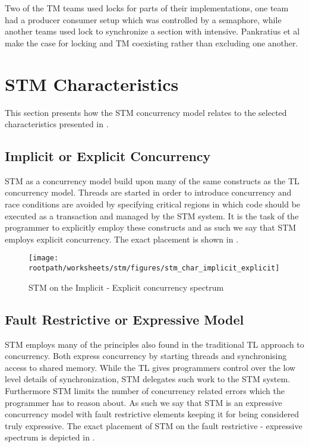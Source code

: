 Two of the \ac{TM} teams used locks for parts of their implementations, one team had a producer consumer setup which was controlled by a semaphore, while another teams used lock to synchronize a section with intensive\cite[p. 5]{pankratius2009does}. Pankratius et al make the case for locking and \ac{TM} coexisting rather than excluding one another.

\section{\acs{STM} Characteristics}
\label{sec:stm_eval}
This section presents how the \ac{STM} concurrency model relates to the selected characteristics presented in . 

\subsection{Implicit or Explicit Concurrency}
\ac{STM} as a concurrency model build upon many of the same constructs as the \ac{TL} concurrency model. Threads are started in order to introduce concurrency and race conditions are avoided by specifying critical regions in which code should be executed as a transaction and managed by the \ac{STM} system. It is the task of the programmer to explicitly employ these constructs and as such we say that \ac{STM} employs explicit concurrency. The exact placement is shown in .

\begin{figure}[htbp]
\centering
 \texttt{[image: \\rootpath/worksheets/stm/figures/stm\_char\_implicit\_explicit]} 
 \caption{\ac{STM} on the Implicit - Explicit concurrency spectrum}
\label{fig:stm_char_impli_expli}
\end{figure}

\subsection{Fault Restrictive or Expressive Model}
\ac{STM} employs many of the principles also found in the traditional \ac{TL} approach to concurrency. Both express concurrency by starting threads and synchronising access to shared memory. While the \ac{TL} gives programmers control over the low level details of synchronization, \ac{STM} delegates such work to the \ac{STM} system. Furthermore \ac{STM} limits the number of concurrency related errors which the programmer has to reason about. As such we say that \ac{STM} is an expressive concurrency model with fault restrictive elements keeping it for being considered truly expressive. The exact placement of \ac{STM} on the fault restrictive - expressive spectrum is depicted in .

